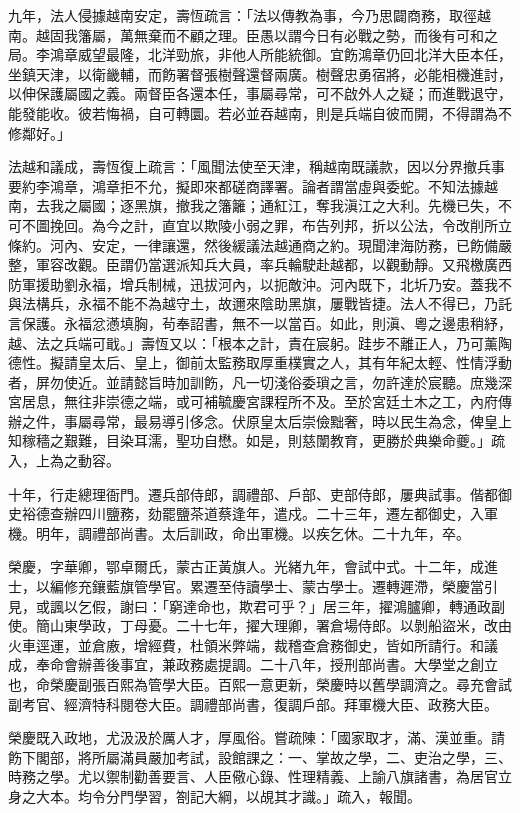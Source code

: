 \begin{pinyinscope}
九年，法人侵據越南安定，壽恆疏言：「法以傳教為事，今乃思闢商務，取徑越南。越固我籓屬，萬無棄而不顧之理。臣愚以謂今日有必戰之勢，而後有可和之局。李鴻章威望最隆，北洋勁旅，非他人所能統御。宜飭鴻章仍回北洋大臣本任，坐鎮天津，以衛畿輔，而飭署督張樹聲還督兩廣。樹聲忠勇宿將，必能相機進討，以伸保護屬國之義。兩督臣各還本任，事屬尋常，可不啟外人之疑；而進戰退守，能發能收。彼若悔禍，自可轉圜。若必並吞越南，則是兵端自彼而開，不得謂為不修鄰好。」

法越和議成，壽恆復上疏言：「風聞法使至天津，稱越南既議款，因以分界撤兵事要約李鴻章，鴻章拒不允，擬即來都磋商譯署。論者謂當虛與委蛇。不知法據越南，去我之屬國；逐黑旗，撤我之籓籬；通紅江，奪我滇江之大利。先機已失，不可不圖挽回。為今之計，直宜以欺陵小弱之罪，布告列邦，折以公法，令改削所立條約。河內、安定，一律讓還，然後緩議法越通商之約。現聞津海防務，已飭備嚴整，軍容改觀。臣謂仍當選派知兵大員，率兵輪駛赴越都，以觀動靜。又飛檄廣西防軍援助劉永福，增兵制械，迅拔河內，以扼敵沖。河內既下，北圻乃安。蓋我不與法構兵，永福不能不為越守土，故邇來陰助黑旗，屢戰皆捷。法人不得已，乃託言保護。永福忿懣填胸，茍奉詔書，無不一以當百。如此，則滇、粵之邊患稍紓，越、法之兵端可戢。」壽恆又以：「根本之計，責在宸躬。跬步不離正人，乃可薰陶德性。擬請皇太后、皇上，御前太監務取厚重樸實之人，其有年紀太輕、性情浮動者，屏勿使近。並請懿旨時加訓飭，凡一切淺俗委瑣之言，勿許達於宸聽。庶幾深宮居息，無往非崇德之端，或可補毓慶宮課程所不及。至於宮廷土木之工，內府傳辦之件，事屬尋常，最易導引侈念。伏原皇太后崇儉黜奢，時以民生為念，俾皇上知稼穡之艱難，目染耳濡，聖功自懋。如是，則慈闈教育，更勝於典樂命夔。」疏入，上為之動容。

十年，行走總理衙門。遷兵部侍郎，調禮部、戶部、吏部侍郎，屢典試事。偕都御史裕德查辦四川鹽務，劾罷鹽茶道蔡逢年，遣戍。二十三年，遷左都御史，入軍機。明年，調禮部尚書。太后訓政，命出軍機。以疾乞休。二十九年，卒。

榮慶，字華卿，鄂卓爾氏，蒙古正黃旗人。光緒九年，會試中式。十二年，成進士，以編修充鑲藍旗管學官。累遷至侍讀學士、蒙古學士。遷轉遲滯，榮慶當引見，或諷以乞假，謝曰：「窮達命也，欺君可乎？」居三年，擢鴻臚卿，轉通政副使。簡山東學政，丁母憂。二十七年，擢大理卿，署倉場侍郎。以剝船盜米，改由火車逕運，並倉廒，增經費，杜領米弊端，裁稽查倉務御史，皆如所請行。和議成，奉命會辦善後事宜，兼政務處提調。二十八年，授刑部尚書。大學堂之創立也，命榮慶副張百熙為管學大臣。百熙一意更新，榮慶時以舊學調濟之。尋充會試副考官、經濟特科閱卷大臣。調禮部尚書，復調戶部。拜軍機大臣、政務大臣。

榮慶既入政地，尤汲汲於厲人才，厚風俗。嘗疏陳：「國家取才，滿、漢並重。請飭下閣部，將所屬滿員嚴加考試，設館課之：一、掌故之學，二、吏治之學，三、時務之學。尤以禦制勸善要言、人臣儆心錄、性理精義、上諭八旗諸書，為居官立身之大本。均令分門學習，劄記大綱，以覘其才識。」疏入，報聞。


\end{pinyinscope}
